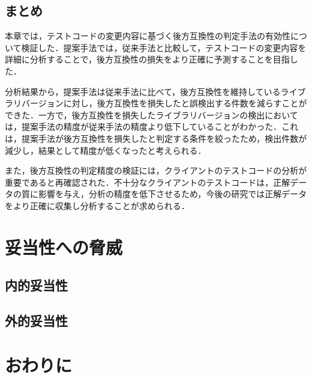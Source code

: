 \documentclass[11pt,dvipdfmx]{jreport}
\begin{document}

\section{まとめ}
本章では，テストコードの変更内容に基づく後方互換性の判定手法の有効性について検証した．提案手法では，従来手法と比較して，テストコードの変更内容を詳細に分析することで，後方互換性の損失をより正確に予測することを目指した．

分析結果から，提案手法は従来手法に比べて，後方互換性を維持しているライブラリバージョンに対し，後方互換性を損失したと誤検出する件数を減らすことができた．一方で，後方互換性を損失したライブラリバージョンの検出においては，提案手法の精度が従来手法の精度より低下していることがわかった．これは，提案手法が後方互換性を損失したと判定する条件を絞ったため，検出件数が減少し，結果として精度が低くなったと考えられる．

また，後方互換性の判定精度の検証には，クライアントのテストコードの分析が重要であると再確認された．不十分なクライアントのテストコードは，正解データの質に影響を与え，分析の精度を低下させるため，今後の研究では正解データをより正確に収集し分析することが求められる．


\chapter{妥当性への脅威}\label{chap:heuristic}

\section{内的妥当性}

\section{外的妥当性}

\chapter{おわりに}\label{chap:end}
\end{document}
